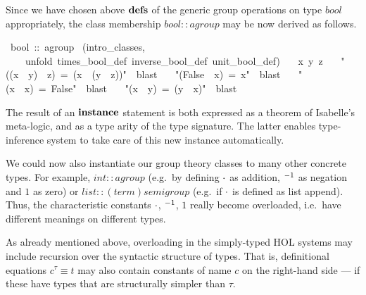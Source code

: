 \begin{isabelle}
\begin{isamarkuptext}
 \medskip Since we have chosen above ${\mathord{\mathbf{defs}}}$ of the generic group
 operations on type $bool$ appropriately, the class membership $bool
 :: agroup$ may be now derived as follows.%
\end{isamarkuptext}%
\ bool\ ::\ agroup\isanewline
{}\ (intro\_classes,\isanewline
\ \ \ \ unfold\ times\_bool\_def\ inverse\_bool\_def\ unit\_bool\_def)\isanewline
\ \ \ x\ y\ z\isanewline
\ \ \ {"}((x\ {\isasymnoteq}\ y)\ {\isasymnoteq}\ z)\ =\ (x\ {\isasymnoteq}\ (y\ {\isasymnoteq}\ z)){"}\ \ blast\isanewline
\ \ \ {"}(False\ {\isasymnoteq}\ x)\ =\ x{"}\ \ blast\isanewline
\ \ \ {"}(x\ {\isasymnoteq}\ x)\ =\ False{"}\ \ blast\isanewline
\ \ \ {"}(x\ {\isasymnoteq}\ y)\ =\ (y\ {\isasymnoteq}\ x){"}\ \ blast\isanewline
{}%
\begin{isamarkuptext}%
The result of an $\emph{\bf instance}$ statement is both expressed
 as a theorem of Isabelle's meta-logic, and as a type arity of the
 type signature.  The latter enables type-inference system to take
 care of this new instance automatically.

 \medskip We could now also instantiate our group theory classes to
 many other concrete types.  For example, $int :: agroup$ (e.g.\ by
 defining $\cdot$ as addition, $\emph{${}^{-1}$}$ as negation and $1$ as
 zero) or $list :: (term)semigroup$ (e.g.\ if $\cdot$ is defined as
 list append).  Thus, the characteristic constants $\cdot$,
 $\emph{${}^{-1}$}$, $1$ really become overloaded, i.e.\ have different
 meanings on different types.%
\end{isamarkuptext}%
%
%
\begin{isamarkuptext}%
As already mentioned above, overloading in the simply-typed HOL
 systems may include recursion over the syntactic structure of types.
 That is, definitional equations $c^\tau \equiv t$ may also contain
 constants of name $c$ on the right-hand side --- if these have types
 that are structurally simpler than $\tau$.


\end{isamarkuptext}
\end{isabelle}
